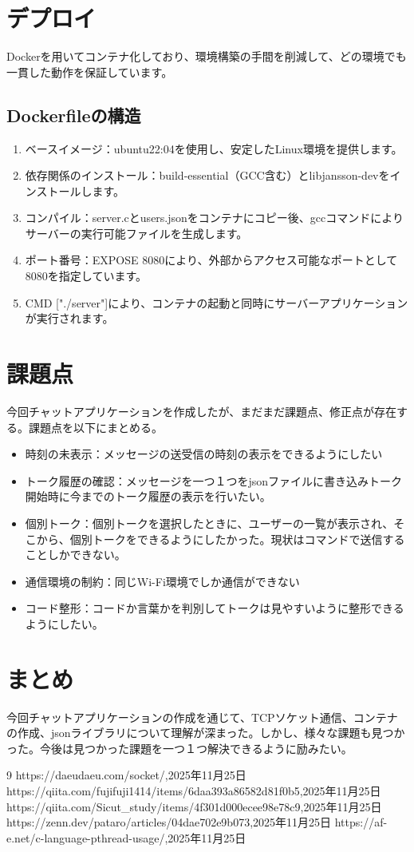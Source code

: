 \documentclass{article}
\begin{document}
\section{デプロイ}
Dockerを用いてコンテナ化しており、環境構築の手間を削減して、どの環境でも一貫した動作を保証しています。
\subsection{Dockerfileの構造}
\begin{enumerate}
    \item ベースイメージ：ubuntu22:04を使用し、安定したLinux環境を提供します。
    \item 依存関係のインストール：build-essential（GCC含む）とlibjansson-devをインストールします。
    \item コンパイル：server.cとusers.jsonをコンテナにコピー後、gccコマンドによりサーバーの実行可能ファイルを生成します。
    \item ポート番号：EXPOSE 8080により、外部からアクセス可能なポートとして8080を指定しています。
    \item CMD ["./server"]により、コンテナの起動と同時にサーバーアプリケーションが実行されます。
\end{enumerate}
\section{課題点}
今回チャットアプリケーションを作成したが、まだまだ課題点、修正点が存在する。課題点を以下にまとめる。
\begin{itemize}
    \item 時刻の未表示：メッセージの送受信の時刻の表示をできるようにしたい
    \item トーク履歴の確認：メッセージを一つ１つをjsonファイルに書き込みトーク開始時に今までのトーク履歴の表示を行いたい。
    \item 個別トーク：個別トークを選択したときに、ユーザーの一覧が表示され、そこから、個別トークをできるようにしたかった。現状はコマンドで送信することしかできない。
    \item 通信環境の制約：同じWi-Fi環境でしか通信ができない
    \item コード整形：コードか言葉かを判別してトークは見やすいように整形できるようにしたい。
\end{itemize}
\section{まとめ}
今回チャットアプリケーションの作成を通じて、TCPソケット通信、コンテナの作成、jsonライブラリについて理解が深まった。しかし、様々な課題も見つかった。今後は見つかった課題を一つ１つ解決できるように励みたい。

\begin{thebibliography}{9}
    https://daeudaeu.com/socket/,2025年11月25日 https://qiita.com/fujifuji1414/items/6daa393a86582d81f0b5,2025年11月25日
    https://qiita.com/Sicut\_study/items/4f301d000ecee98e78c9,2025年11月25日
    https://zenn.dev/pataro/articles/04dae702e9b073,2025年11月25日
    https://af-e.net/c-language-pthread-usage/,2025年11月25日

\end{thebibliography}
\end{document}

